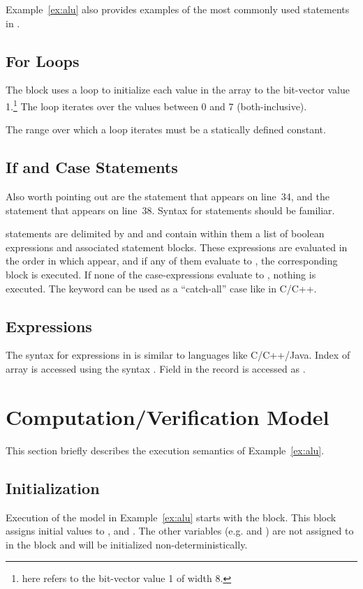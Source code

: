 Example~\ref{ex:alu} also provides examples of the most commonly used statements in \uclid{}. 

\subsection{For Loops}
The  block uses a  loop to initialize each value in the array  to the bit-vector value 1.\footnote{ here refers to the bit-vector value 1 of width 8.} The loop iterates over the values between 0 and 7 (both-inclusive). 

The range over which a  loop iterates must be a statically defined constant.

\subsection{If and Case Statements}
Also worth pointing out are the  statement that appears on line~34, and the  statement that appears on line~38. Syntax for  statements should be familiar. 

 statements are delimited by  and  and contain within them a list of boolean expressions and associated statement blocks. These expressions are evaluated in the order in which appear, and if any of them evaluate to , the corresponding block is executed. If none of the case-expressions evaluate to , nothing is executed. The keyword  can be used as a ``catch-all'' case like in C/C++. 

\subsection{Expressions}

The syntax for expressions in \uclid{} is similar to languages like C/C++/Java. Index  of array  is accessed using the syntax . Field  in the record  is accessed as . 

\section{Computation/Verification Model}
This section briefly describes the execution semantics of Example~\ref{ex:alu}.

\subsection{Initialization}
Execution of the model in Example~\ref{ex:alu} starts with the  block. This block assigns initial values to ,  and . The other variables (e.g.  and ) are not assigned to in the  block and will be initialized non-deterministically.

